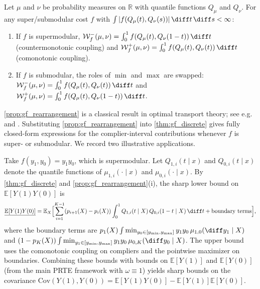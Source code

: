 \begin{proposition}\label{prop:gf_rearrangement}
    Let $\mu$ and $\nu$ be probability measures on $\mathbb{R}$ with quantile functions $Q_\mu$ and $Q_\nu$. For any super/submodular cost $f$ with $\int |f(Q_\mu(t), Q_\nu(s))|\, \diff t\, \diff s < \infty$:
    \begin{enumerate}
        \item[\textup{(i)}] If $f$ is supermodular, $\mathcal{W}_f^-(\mu, \nu) = \int_0^1 f(Q_\mu(t), Q_\nu(1-t))\, \diff t$ (countermonotonic coupling) and $\mathcal{W}_f^+(\mu, \nu) = \int_0^1 f(Q_\mu(t), Q_\nu(t))\, \diff t$ (comonotonic coupling).
        \item[\textup{(ii)}] If $f$ is submodular, the roles of $\min$ and $\max$ are swapped: $\mathcal{W}_f^-(\mu, \nu) = \int_0^1 f(Q_\mu(t), Q_\nu(t))\, \diff t$ and $\mathcal{W}_f^+(\mu, \nu) = \int_0^1 f(Q_\mu(t), Q_\nu(1-t))\, \diff t$.
    \end{enumerate}
\end{proposition}

\cref{prop:gf_rearrangement} is a classical result in optimal transport theory; see e.g. \citet[Chapter 4]{galichon2016optimal} and \citet{villani2021topics}. Substituting \cref{prop:gf_rearrangement} into \cref{thm:gf_discrete} gives fully closed-form expressions for the complier-interval contributions whenever $f$ is super- or submodular. We record two illustrative applications.

\begin{example}\label{ex:gf_cov}
    Take $f(y_1, y_0) = y_1 y_0$, which is supermodular. Let $Q_{1, i}(t \mid x)$ and $Q_{0, i}(t \mid x)$ denote the quantile functions of $\mu_{1, i}(\cdot \mid x)$ and $\mu_{0, i}(\cdot \mid x)$. By \cref{thm:gf_discrete} and \cref{prop:gf_rearrangement}(i), the sharp lower bound on $\mathbb{E}[Y(1) Y(0)]$ is
    \[
        \underline{\mathbb{E}[Y(1)Y(0)]} = \mathbb{E}_X\Bigl[\sum_{i=1}^{K-1}(p_{i+1}(X) - p_i(X)) \int_0^1 Q_{1,i}(t \mid X)\, Q_{0,i}(1-t \mid X)\, \diff t + \text{boundary terms}\Bigr],
    \]
    where the boundary terms are $p_1(X) \int \min_{y_0 \in [y_{\min}, y_{\max}]} y_1 y_0\, \mu_{1,0}(\diff y_1 \mid X)$ and $(1 - p_K(X)) \int \min_{y_1 \in [y_{\min}, y_{\max}]} y_1 y_0\, \mu_{0, K}(\diff y_0 \mid X)$. The upper bound uses the comonotonic coupling on compliers and the pointwise maximizer on boundaries. Combining these bounds with bounds on $\mathbb{E}[Y(1)]$ and $\mathbb{E}[Y(0)]$ (from the main PRTE framework with $\omega \equiv 1$) yields sharp bounds on the covariance $\mathrm{Cov}(Y(1), Y(0)) = \mathbb{E}[Y(1) Y(0)] - \mathbb{E}[Y(1)]\mathbb{E}[Y(0)]$.
\end{example}

